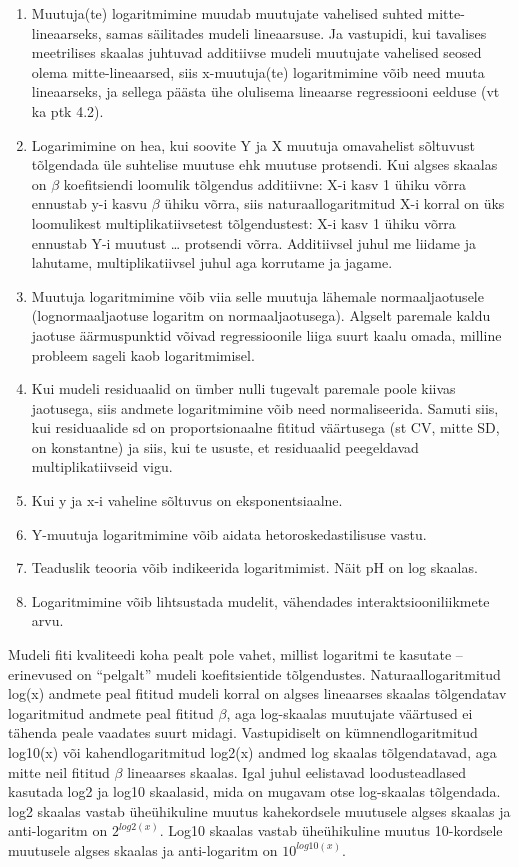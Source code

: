 \documentclass[]{book}
\begin{document}
\begin{enumerate}
\def\labelenumi{\arabic{enumi}.}
\item
  Muutuja(te) logaritmimine muudab muutujate vahelised suhted
  mitte-lineaarseks, samas säilitades mudeli lineaarsuse. Ja vastupidi,
  kui tavalises meetrilises skaalas juhtuvad additiivse mudeli muutujate
  vahelised seosed olema mitte-lineaarsed, siis x-muutuja(te)
  logaritmimine võib need muuta lineaarseks, ja sellega päästa ühe
  olulisema lineaarse regressiooni eelduse (vt ka ptk 4.2).
\item
  Logarimimine on hea, kui soovite Y ja X muutuja omavahelist sõltuvust
  tõlgendada üle suhtelise muutuse ehk muutuse protsendi. Kui algses
  skaalas on \(\beta\) koefitsiendi loomulik tõlgendus additiivne: X-i
  kasv 1 ühiku võrra ennustab y-i kasvu \(\beta\) ühiku võrra, siis
  naturaallogaritmitud X-i korral on üks loomulikest
  multiplikatiivsetest tõlgendustest: X-i kasv 1 ühiku võrra ennustab
  Y-i muutust \ldots{} protsendi võrra. Additiivsel juhul me liidame ja
  lahutame, multiplikatiivsel juhul aga korrutame ja jagame.
\item
  Muutuja logaritmimine võib viia selle muutuja lähemale
  normaaljaotusele (lognormaaljaotuse logaritm on normaaljaotusega).
  Algselt paremale kaldu jaotuse äärmuspunktid võivad regressioonile
  liiga suurt kaalu omada, milline probleem sageli kaob logaritmimisel.
\item
  Kui mudeli residuaalid on ümber nulli tugevalt paremale poole kiivas
  jaotusega, siis andmete logaritmimine võib need normaliseerida. Samuti
  siis, kui residuaalide sd on proportsionaalne fititud väärtusega (st
  CV, mitte SD, on konstantne) ja siis, kui te ususte, et residuaalid
  peegeldavad multiplikatiivseid vigu.
\item
  Kui y ja x-i vaheline sõltuvus on eksponentsiaalne.
\item
  Y-muutuja logaritmimine võib aidata hetoroskedastilisuse vastu.
\item
  Teaduslik teooria võib indikeerida logaritmimist. Näit pH on log
  skaalas.
\item
  Logaritmimine võib lihtsustada mudelit, vähendades
  interaktsiooniliikmete arvu.
\end{enumerate}

Mudeli fiti kvaliteedi koha pealt pole vahet, millist logaritmi te
kasutate -- erinevused on ``pelgalt'' mudeli koefitsientide
tõlgendustes. Naturaallogaritmitud log(x) andmete peal fititud mudeli
korral on algses lineaarses skaalas tõlgendatav logaritmitud andmete
peal fititud \(\beta\), aga log-skaalas muutujate väärtused ei tähenda
peale vaadates suurt midagi. Vastupidiselt on kümnendlogaritmitud
log10(x) või kahendlogaritmitud log2(x) andmed log skaalas
tõlgendatavad, aga mitte neil fititud \(\beta\) lineaarses skaalas. Igal
juhul eelistavad loodusteadlased kasutada log2 ja log10 skaalasid, mida
on mugavam otse log-skaalas tõlgendada. log2 skaalas vastab üheühikuline
muutus kahekordsele muutusele algses skaalas ja anti-logaritm on
\(2^{log2(x)}\). Log10 skaalas vastab üheühikuline muutus 10-kordsele
muutusele algses skaalas ja anti-logaritm on \(10^{log10(x)}\).
\end{document}
